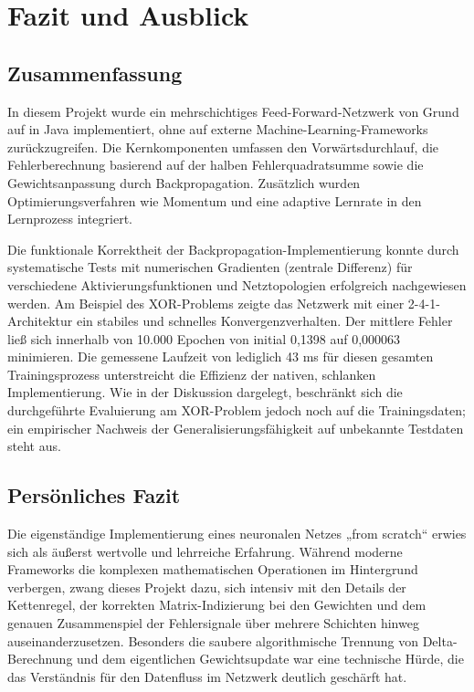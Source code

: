 \section{Fazit und Ausblick}
\label{sec:fazit}

\subsection{Zusammenfassung}

In diesem Projekt wurde ein mehrschichtiges Feed-Forward-Netzwerk von Grund auf in Java implementiert, ohne auf externe Machine-Learning-Frameworks zurückzugreifen. Die Kernkomponenten umfassen den Vorwärtsdurchlauf, die Fehlerberechnung basierend auf der halben Fehlerquadratsumme sowie die Gewichtsanpassung durch Backpropagation. Zusätzlich wurden Optimierungsverfahren wie Momentum und eine adaptive Lernrate in den Lernprozess integriert.

Die funktionale Korrektheit der Backpropagation-Implementierung konnte durch systematische Tests mit numerischen Gradienten (zentrale Differenz) für verschiedene Aktivierungsfunktionen und Netztopologien erfolgreich nachgewiesen werden. Am Beispiel des XOR-Problems zeigte das Netzwerk mit einer 2-4-1-Architektur ein stabiles und schnelles Konvergenzverhalten. Der mittlere Fehler ließ sich innerhalb von 10.000 Epochen von initial 0,1398 auf 0,000063 minimieren. Die gemessene Laufzeit von lediglich 43 ms für diesen gesamten Trainingsprozess unterstreicht die Effizienz der nativen, schlanken Implementierung. Wie in der Diskussion dargelegt, beschränkt sich die durchgeführte Evaluierung am XOR-Problem jedoch noch auf die Trainingsdaten; ein empirischer Nachweis der Generalisierungsfähigkeit auf unbekannte Testdaten steht aus.

\subsection{Persönliches Fazit}

Die eigenständige Implementierung eines neuronalen Netzes „from scratch“ erwies sich als äußerst wertvolle und lehrreiche Erfahrung. Während moderne Frameworks die komplexen mathematischen Operationen im Hintergrund verbergen, zwang dieses Projekt dazu, sich intensiv mit den Details der Kettenregel, der korrekten Matrix-Indizierung bei den Gewichten und dem genauen Zusammenspiel der Fehlersignale über mehrere Schichten hinweg auseinanderzusetzen. Besonders die saubere algorithmische Trennung von Delta-Berechnung und dem eigentlichen Gewichtsupdate war eine technische Hürde, die das Verständnis für den Datenfluss im Netzwerk deutlich geschärft hat.

